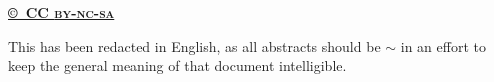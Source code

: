 \foreignlanguage{english}{\href{https://creativecommons.org/licenses/by-nc-sa/4.0/}{\textbf{©~CC \textsc{by-nc-sa}}}}\par\foreignlanguage{english}{This has been redacted in English, as all abstracts should be $\sim$ in an effort to keep the general meaning of that document intelligible.}